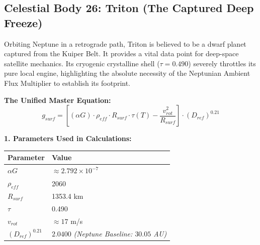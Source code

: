 \documentclass[11pt, a4paper]{article}
\begin{document}
\clearpage
\subsection{Celestial Body 26: Triton (The Captured Deep Freeze)}
  Orbiting Neptune in a retrograde path, Triton is believed to be a dwarf planet captured from the Kuiper Belt. It provides a vital data point for deep-space satellite mechanics. Its cryogenic crystalline shell ($\tau = 0.490$) severely throttles its pure local engine, highlighting the absolute necessity of the Neptunian Ambient Flux Multiplier to establish its footprint.

  \vspace{0.5em}
  \noindent \textbf{The Unified Master Equation:}
  $$ g_{surf} = \left[ (\alpha G) \cdot \rho_{eff} \cdot R_{surf} \cdot \tau(T) - \frac{v_{rot}^2}{R_{surf}} \right] \cdot (D_{ref})^{0.21} $$

  \vspace{0.5em}
  \noindent \textbf{1. Parameters Used in Calculations:} \\[0.5em]
  \begingroup
  \renewcommand{\arraystretch}{1.3}
  \hspace*{2em}
  \begin{tabular}{|l|l|}
    \hline
    \textbf{Parameter} & \textbf{Value} \\ \hline
    $\alpha G$ & $\approx 2.792 \times 10^{-7}$ \\ \hline
    $\rho_{eff}$ & 2060 \\ \hline
    $R_{surf}$ & 1353.4 km \\ \hline
    $\tau$ & 0.490 \\ \hline
    $v_{rot}$ & $\approx 17$ m/s \\ \hline
    $(D_{ref})^{0.21}$ & $2.0400$ \textit{(Neptune Baseline: $30.05$ AU)} \\ \hline
  \end{tabular}
  \endgroup
\end{document}
